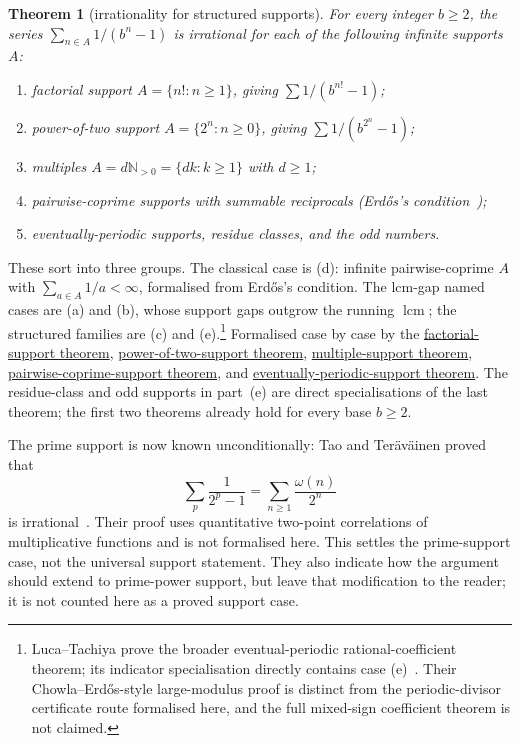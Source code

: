 \documentclass[11pt]{article}
\newcommand{\commit}{312b96c0d149ed466725c62d4ef24cfc91bca34e}
\newcommand{\repobase}{https://github.com/wcook04/plectis-lean-erdos249-257/blob/\commit}
\newcommand{\PK}{Erdos249257}
\newcommand{\lword}[4]{\href{\repobase/\PK/#1\#L#2}{#4}}
\newtheorem{theorem}{Theorem}[section]
\theoremstyle{definition}
\theoremstyle{remark}
\newcommand{\Npos}{\mathbb{N}_{>0}}
\newcommand{\lcm}{\operatorname{lcm}}
\begin{document}
\begin{theorem}[irrationality for structured supports]\label{res:support}
For every integer $b\ge2$, the series $\sum_{n\in A} 1/(b^n-1)$ is irrational for
each of the following infinite supports $A$:
\begin{enumerate}[label=\textup{(\alph*)},leftmargin=2em]
\item factorial support $A=\{n! : n\ge1\}$, giving $\sum 1/(b^{n!}-1)$;
\item power-of-two support $A=\{2^n : n\ge0\}$, giving $\sum 1/(b^{2^n}-1)$;
\item multiples $A=d\Npos=\{dk:k\ge1\}$ with $d\ge1$;
\item pairwise-coprime supports with summable reciprocals (Erd\H{o}s's
condition~\cite[Theorem, p.~222]{erdos1968});
\item eventually-periodic supports, residue classes, and the odd numbers.
\end{enumerate}
\end{theorem}
\noindent These sort into three groups. The classical case is (d): infinite
pairwise-coprime $A$ with $\sum_{a\in A}1/a<\infty$, formalised from Erd\H{o}s's
condition. The lcm-gap named cases are (a) and (b), whose support gaps outgrow the
running $\lcm$; the structured families are (c) and (e).\footnote{Luca--Tachiya
prove the broader eventual-periodic rational-coefficient theorem; its indicator
specialisation directly contains case (e)~\cite{lucatachiya}. Their
Chowla--Erd\H{o}s-style large-modulus proof is distinct from the periodic-divisor
certificate route formalised here, and the full mixed-sign coefficient theorem is
not claimed.}
\noindent Formalised case by case by the
\lword{CertificateKernel.lean}{5707}{irrational_erdosSum_factorial_support}{factorial-support theorem},
\lword{CertificateKernel.lean}{5731}{irrational_erdosSum_two_pow_support}{power-of-two-support theorem},
\lword{CertificateKernel.lean}{8775}{irrational_erdosSupportSeries_multiples}{multiple-support theorem},
\lword{CertificateKernel.lean}{10448}{irrational_erdosSupportSeries_pairwise_coprime}{pairwise-coprime-support theorem},
and
\lword{CertificateKernel.lean}{11276}{irrational_erdosSupportSeries_eventuallyPeriodic}{eventually-periodic-support theorem}.
The residue-class and odd supports in part~\textup{(e)} are direct
specialisations of the last theorem; the first two theorems already hold for
every base \(b\geq2\).

The prime support is now known unconditionally: Tao and Ter\"av\"ainen proved
that
\[
  \sum_p\frac1{2^p-1}=\sum_{n\ge1}\frac{\omega(n)}{2^n}
\]
is irrational~\cite[Theorem~1.3]{taoteravainen}. Their proof uses quantitative two-point
correlations of multiplicative functions and is not formalised here. This
settles the prime-support case, not the universal support statement.
They also indicate how the argument should extend to
prime-power support, but leave that modification to the reader; it is not
counted here as a proved support case.
\end{document}

